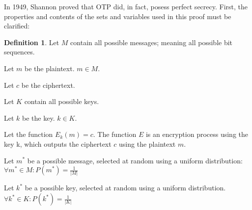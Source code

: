 \documentclass[12pt, a4paper]{report}
\theoremstyle{definition}
\newtheorem{defin}[thm]{Definition}
\theoremstyle{remark}
\begin{document}
%


In 1949, Shannon proved that OTP did, in fact, posess perfect secrecy\cite{ShannonOTP}. First, the properties and contents of the sets and variables used in this proof must be clarified:

\begin{defin}
Let $M$ contain all possible messages; meaning all possible bit sequences.

Let $m$ be the plaintext. $m \in M$.

Let $c$ be the ciphertext.

Let $K$ contain all possible keys.

Let $k$ be the key. $k \in K$.

Let the function ${E_k}(m)=c$. The function $E$ is an encryption process using the key k, which outputs the ciphertext $c$ using the plaintext $m$.

Let $m^{*}$ be a possible message, selected at random using a uniform distribution:
$\forall m^{*} \in M: P(m^{*})=\frac{1}{\lvert M \rvert}$

Let $k^{*}$ be a possible key, selected at random using a uniform distribution.
$\forall k^{*} \in K: P(k^{*})=\frac{1}{\lvert K \rvert}$
\end{defin}
\end{document}
